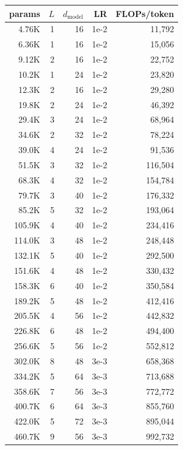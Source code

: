 \documentclass[10pt]{article}
\begin{document}
\begin{table}[h]
\centering
\footnotesize
\begin{tabular}{rrrrr}
\toprule
params & $L$ & $d_{\mathrm{model}}$ & LR & FLOPs/token \\
\midrule
4.76K & 1 & 16 & 1e-2 & 11{,}792 \\
6.36K & 1 & 16 & 1e-2 & 15{,}056 \\
9.12K & 2 & 16 & 1e-2 & 22{,}752 \\
10.2K & 1 & 24 & 1e-2 & 23{,}820 \\
12.3K & 2 & 16 & 1e-2 & 29{,}280 \\
19.8K & 2 & 24 & 1e-2 & 46{,}392 \\
29.4K & 3 & 24 & 1e-2 & 68{,}964 \\
34.6K & 2 & 32 & 1e-2 & 78{,}224 \\
39.0K & 4 & 24 & 1e-2 & 91{,}536 \\
51.5K & 3 & 32 & 1e-2 & 116{,}504 \\
68.3K & 4 & 32 & 1e-2 & 154{,}784 \\
79.7K & 3 & 40 & 1e-2 & 176{,}332 \\
85.2K & 5 & 32 & 1e-2 & 193{,}064 \\
105.9K & 4 & 40 & 1e-2 & 234{,}416 \\
114.0K & 3 & 48 & 1e-2 & 248{,}448 \\
132.1K & 5 & 40 & 1e-2 & 292{,}500 \\
151.6K & 4 & 48 & 1e-2 & 330{,}432 \\
158.3K & 6 & 40 & 1e-2 & 350{,}584 \\
189.2K & 5 & 48 & 1e-2 & 412{,}416 \\
205.5K & 4 & 56 & 1e-2 & 442{,}832 \\
226.8K & 6 & 48 & 1e-2 & 494{,}400 \\
256.6K & 5 & 56 & 1e-2 & 552{,}812 \\
302.0K & 8 & 48 & 3e-3 & 658{,}368 \\
334.2K & 5 & 64 & 3e-3 & 713{,}688 \\
358.6K & 7 & 56 & 3e-3 & 772{,}772 \\
400.7K & 6 & 64 & 3e-3 & 855{,}760 \\
422.0K & 5 & 72 & 3e-3 & 895{,}044 \\
460.7K & 9 & 56 & 3e-3 & 992{,}732 \\
\bottomrule
\end{tabular}
\hspace{1em}
\begin{tabular}{rrrrr}

\end{tabular}
\end{table}
\end{document}
